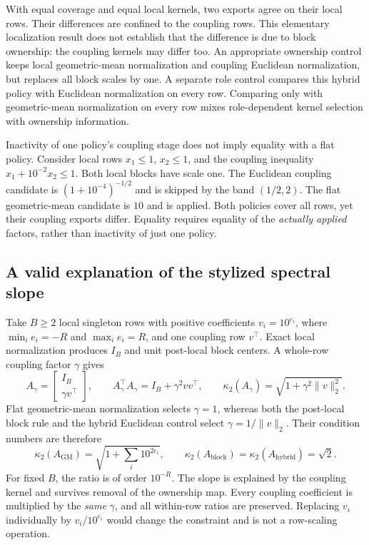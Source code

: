 With equal coverage and equal local kernels, two exports agree on their local
rows. Their differences are confined to the coupling rows. This elementary
localization result does not establish that the difference is due to block
ownership: the coupling kernels may differ too. An appropriate ownership control
keeps local geometric-mean normalization and coupling Euclidean normalization,
but replaces all block scales by one. A separate role control compares this
hybrid policy with Euclidean normalization on every row. Comparing only with
geometric-mean normalization on every row mixes role-dependent kernel selection
with ownership information.

Inactivity of one policy's coupling stage does not imply equality with a flat
policy. Consider local rows $x_1\leq1$, $x_2\leq1$, and the coupling inequality
$x_1+10^{-2}x_2\leq1$. Both local blocks have scale one. The Euclidean coupling
candidate is $(1+10^{-4})^{-1/2}$ and is skipped by the band $(1/2,2)$. The flat
geometric-mean candidate is $10$ and is applied. Both policies cover all rows,
yet their coupling exports differ. Equality requires equality of the
\emph{actually applied} factors, rather than inactivity of just one policy.

\subsection{A valid explanation of the stylized spectral slope}

Take $B\geq2$ local singleton rows with positive coefficients $v_i=10^{e_i}$,
where $\min_i e_i=-R$ and $\max_i e_i=R$, and one coupling row $v^\top$.
Exact local normalization produces $I_B$ and unit post-local block centers. A
whole-row coupling factor $\gamma$ gives
\[
 A_\gamma=\begin{bmatrix}I_B\\\gamma v^\top\end{bmatrix},
 \qquad A_\gamma^\top A_\gamma=I_B+\gamma^2vv^\top,
 \qquad
 \kappa_2(A_\gamma)=\sqrt{1+\gamma^2\|v\|_2^2}.
\]
Flat geometric-mean normalization selects $\gamma=1$, whereas both the
post-local block rule and the hybrid Euclidean control select
$\gamma=1/\|v\|_2$. Their condition numbers are therefore
\[
 \kappa_2(A_{\mathrm{GM}})=\sqrt{1+\sum_i10^{2e_i}},
 \qquad
 \kappa_2(A_{\mathrm{block}})=\kappa_2(A_{\mathrm{hybrid}})=\sqrt2.
\]
For fixed $B$, the ratio is of order $10^{-R}$. The slope is explained by the
coupling kernel and survives removal of the ownership map. Every coupling
coefficient is multiplied by the \emph{same} $\gamma$, and all within-row ratios
are preserved. Replacing $v_i$ individually by $v_i/10^{e_i}$ would change the
constraint and is not a row-scaling operation.


